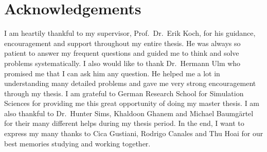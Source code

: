 \chapter*{Acknowledgements}

I am heartily thankful to my supervisor, Prof.\ Dr.\ Erik Koch,
for his guidance, encouragement and support throughout my entire
thesis. He was always so patient to answer my frequent questions
and guided me to think and solve problems systematically.
I also would like to thank Dr.\ Hermann Ulm who promised me that
I can ask him any question. He helped me a lot in understanding
many detailed problems and gave me very strong encouragement through my thesis.
I am grateful to German Research School for Simulation Sciences for
providing me this great opportunity of doing my master thesis.
I am also thankful to Dr.\ Hunter Sims, Khaldoon Ghanem and Michael Baumg\"{a}rtel
for their many different helps during my thesis period.
In the end, I want to express my many thanks to Cica Gustiani, Rodrigo Canales
and Thu Hoai for our best memories studying and working together.
